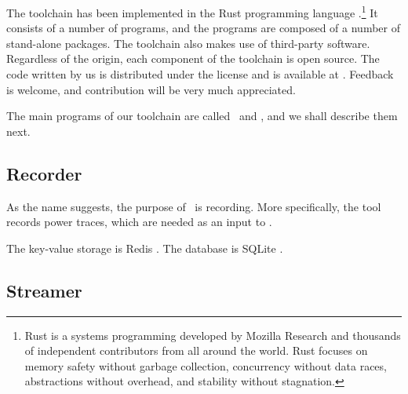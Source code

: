 The toolchain has been implemented in the Rust programming language
\cite{rust}.\footnote{Rust is a systems programming developed by Mozilla
Research and thousands of independent contributors from all around the world.
Rust focuses on memory safety without garbage collection, concurrency without
data races, abstractions without overhead, and stability without stagnation.} It
consists of a number of programs, and the programs are composed of a number of
stand-alone packages. The toolchain also makes use of third-party software.
Regardless of the origin, each component of the toolchain is open source. The
code written by us is distributed under the  license \cite{mit} and is
available at \cite{sources}. Feedback is welcome, and contribution will be very
much appreciated.

The main programs of our toolchain are called \recorder\ and \streamer, and we
shall describe them next.

\subsection{Recorder}

As the name suggests, the purpose of \recorder\ is recording. More specifically,
the tool records power traces, which are needed as an input to \streamer.

The key-value storage is Redis \cite{redis}. The database is SQLite
\cite{sqlite}.

\subsection{Streamer}
